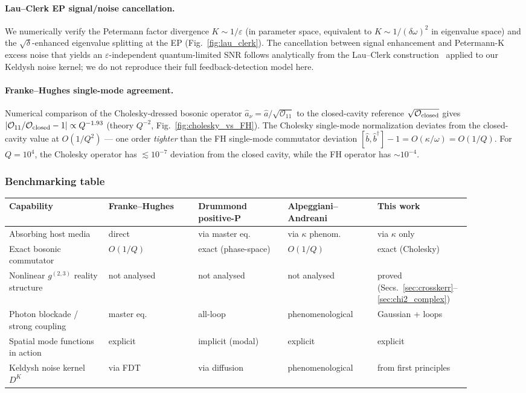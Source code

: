 \documentclass[12pt]{article}
\newcommand{\calO}{\mathcal{O}}
\begin{document}
\paragraph{Lau--Clerk EP signal/noise cancellation.}
We numerically verify the Petermann factor divergence $K \sim 1/\varepsilon$
(in parameter space, equivalent to $K\sim 1/(\delta\omega)^2$ in eigenvalue
space) and the $\sqrt\delta$-enhanced eigenvalue splitting at the EP
(Fig.~\ref{fig:lau_clerk}).  The cancellation between signal enhancement
and Petermann-K excess noise that yields an $\varepsilon$-independent
quantum-limited SNR follows analytically from the Lau--Clerk
construction~\cite{Lau2018} applied to our Keldysh noise kernel; we do
not reproduce their full feedback-detection model here.

\paragraph{Franke--Hughes single-mode agreement.}
Numerical comparison of the Cholesky-dressed bosonic operator
$\hat a_\nu = \hat a/\sqrt{\calO_{11}}$ to the closed-cavity reference
$\sqrt{\calO_{\rm closed}}$ gives
$|\calO_{11}/\calO_{\rm closed} - 1| \propto Q^{-1.93}$ (theory $Q^{-2}$,
Fig.~\ref{fig:cholesky_vs_FH}).  The Cholesky single-mode normalization
deviates from the closed-cavity value at $O(1/Q^2)$ --- one order
\emph{tighter} than the FH single-mode commutator deviation
$[\hat b,\hat b^\dagger]-1 = O(\kappa/\omega) = O(1/Q)$.  For $Q=10^4$,
the Cholesky operator has $\lesssim 10^{-7}$ deviation from the closed
cavity, while the FH operator has $\sim 10^{-4}$.

\subsubsection*{Benchmarking table}

\begin{center}
\begin{tabular}{p{0.20\linewidth}p{0.18\linewidth}p{0.18\linewidth}p{0.18\linewidth}p{0.15\linewidth}}
\toprule
Capability & Franke--Hughes & Drummond positive-P & Alpeggiani--Andreani & This work \\
\midrule
Absorbing host media & direct & via master eq. &
  via $\kappa$ phenom. & via $\kappa$ only \\
Exact bosonic commutator & $O(1/Q)$ & exact (phase-space) & $O(1/Q)$ & exact (Cholesky) \\
Nonlinear $g^{(2,3)}$ reality structure & not analysed & not analysed & not analysed & proved (Secs.~\ref{sec:crosskerr}--\ref{sec:chi2_complex}) \\
Photon blockade / strong coupling & master eq. & all-loop & phenomenological & Gaussian + loops \\
Spatial mode functions in action & explicit & implicit (modal) & explicit & explicit \\
Keldysh noise kernel $D^K$ & via FDT & via diffusion & phenomenological & from first principles \\
\bottomrule
\end{tabular}
\end{center}
\end{document}
